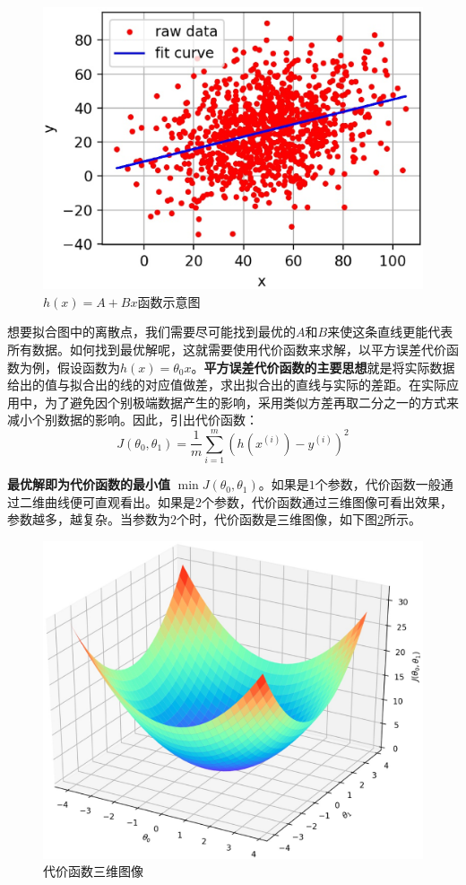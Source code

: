 \begin{figure}[h]
   \centering
   \includegraphics[width=.7\textwidth]{imgs/2.16.1.eps}
   \caption{$h(x) = A + Bx$函数示意图}
   \label{fig:2.4}
 \end{figure}

想要拟合图中的离散点，我们需要尽可能找到最优的$A$和$B$来使这条直线更能代表所有数据。如何找到最优解呢，这就需要使用代价函数来求解，以平方误差代价函数为例，假设函数为$h(x)=\theta_0x$。{\bf 平方误差代价函数的主要思想}就是将实际数据给出的值与拟合出的线的对应值做差，求出拟合出的直线与实际的差距。在实际应用中，为了避免因个别极端数据产生的影响，采用类似方差再取二分之一的方式来减小个别数据的影响。因此，引出代价函数：
$$
J(\theta_0, \theta_1) = \frac{1}{m}\sum_{i=1}^m(h(x^{(i)})-y^{(i)})^2
$$

{\bf 最优解即为代价函数的最小值} $\min J(\theta_0, \theta_1)$。如果是$1$个参数，代价函数一般通过二维曲线便可直观看出。如果是$2$个参数，代价函数通过三维图像可看出效果，参数越多，越复杂。当参数为$2$个时，代价函数是三维图像，如下图\ref{fig:2.5}所示。

 \begin{figure}[h]
   \centering
   \includegraphics[width=.7\textwidth]{imgs/2.16.2.eps}
   \caption{代价函数三维图像}
   \label{fig:2.5}
 \end{figure}


